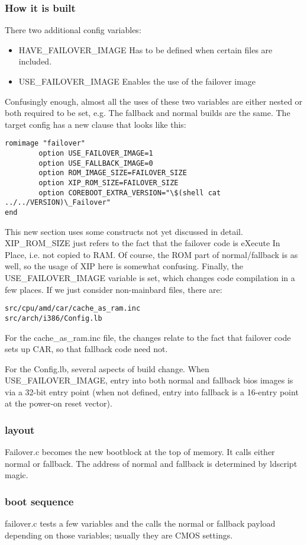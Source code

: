 \documentclass[titlepage,12pt]{article}
\begin{document}
\subsubsection{How it is built}
There two additional config variables: 
\begin{itemize}
\item HAVE\_FAILOVER\_IMAGE Has to be defined when certain files are included. 
\item USE\_FAILOVER\_IMAGE Enables the use of the failover image
\end{itemize}
Confusingly enough, almost all the uses of these two variables are either nested or both required to be set, e.g. 
The fallback and normal builds are the same. The target config has a new clause that looks like this: 
\begin{verbatim}
romimage "failover"
        option USE_FAILOVER_IMAGE=1
        option USE_FALLBACK_IMAGE=0
        option ROM_IMAGE_SIZE=FAILOVER_SIZE
        option XIP_ROM_SIZE=FAILOVER_SIZE
        option COREBOOT_EXTRA_VERSION="\$(shell cat ../../VERSION)\_Failover"
end
\end{verbatim}
This new section uses some constructs not yet discussed in detail. XIP\_ROM\_SIZE just refers to the 
fact that the failover code is eXecute In Place, i.e. not copied to RAM. Of course, the ROM part of normal/fallback is as well, so the usage of XIP here is somewhat confusing. Finally, the USE\_FAILOVER\_IMAGE variable is set, which changes code compilation in a few places. If we just consider non-mainbard files, there are: 
\begin{verbatim}
src/cpu/amd/car/cache_as_ram.inc
src/arch/i386/Config.lb
\end{verbatim}
For the cache\_as\_ram.inc file, the changes relate to the fact that failover code sets up CAR, so that fallback code need not.

For the Config.lb, several aspects of build change. 
When USE\_FAILOVER\_IMAGE, entry into both normal and fallback bios images is via a 32-bit entry point (when not defined, entry into fallback is a 16-entry point at the power-on reset vector). 
\subsubsection{layout}
Failover.c becomes the new bootblock at the top of memory. It calls either normal or fallback. The address of normal and fallback is determined by ldscript magic. 
\subsubsection{boot sequence}
failover.c tests a few variables and the calls the normal or fallback payload depending on those variables; usually they are CMOS settings. 
\end{document}
